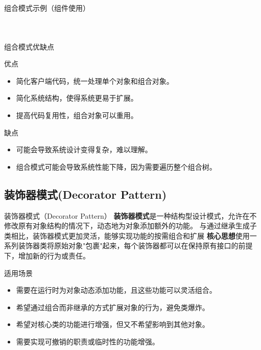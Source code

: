 \documentclass[UTF8,aspectratio=169]{beamer}
\begin{document}
\begin{frame}{组合模式示例（组件使用）}
    \begin{columns}
        \begin{column}{0.48\textwidth}
            \inputminted[firstline=42, lastline=54]{cpp}{code/composite_pattern.cpp}
        \end{column}
        \begin{column}{0.48\textwidth}
            \inputminted[firstline=55, lastline=66]{cpp}{code/composite_pattern.cpp}
        \end{column}
    \end{columns}
\end{frame}

\begin{frame}{组合模式优缺点}
    \begin{ytublock}{优点}
        \begin{itemize}
            \item 简化客户端代码，统一处理单个对象和组合对象。
            \item 简化系统结构，使得系统更易于扩展。
            \item 提高代码复用性，组合对象可以重用。
        \end{itemize}
    \end{ytublock}
    \begin{alertytublock}{缺点}
        \begin{itemize}
            \item 可能会导致系统设计变得复杂，难以理解。
            \item 组合模式可能会导致系统性能下降，因为需要遍历整个组合树。
        \end{itemize}
    \end{alertytublock}
\end{frame}

\subsection{装饰器模式(Decorator Pattern)}

\begin{frame}{装饰器模式（Decorator Pattern）}
    \textbf{装饰器模式}是一种结构型设计模式，允许在不修改原有对象结构的情况下，动态地为对象添加额外的功能。
    与通过继承生成子类相比，装饰器模式更加灵活，能够实现功能的按需组合和扩展
    \textbf{核心思想}使用一系列装饰器类将原始对象"包裹"起来，每个装饰器都可以在保持原有接口的前提下，增加新的行为或责任。

    \begin{ytublock}{适用场景}
        \begin{itemize}
            \item 需要在运行时为对象动态添加功能，且这些功能可以灵活组合。
            \item 希望通过组合而非继承的方式扩展对象的行为，避免类爆炸。
            \item 希望对核心类的功能进行增强，但又不希望影响到其他对象。
            \item 需要实现可撤销的职责或临时性的功能增强。
        \end{itemize}
    \end{ytublock}
\end{frame}
\end{document}
